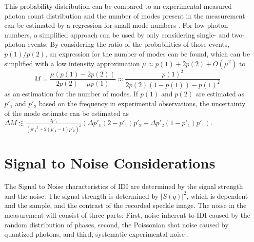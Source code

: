 This probability distribution can be compared to an experimental measured photon count distribution and the number of modes present in the measurement can be estimated by a regression for small mode numbers \cite{lehmkuhler2014,yun2019}. 
For low photon numbers, a simplified approach can be used by only considering single- and two-photon events: By considering the ratio of the probabilities of those events, $p(1) / p(2)$,  an expression for the number of modes can be found, which can be simplified with a low intensity approximation $\mu\approx p(1)+2p(2)+O(\mu^2)$ to 
\begin{equation}
	M=\frac{\mu  (p(1)-2 p(2))}{2 p(2)-\mu  p(1)}\approx \frac{p(1)^2}{2 p(2) (1-p(1))-p(1)^2}
	\label{eq:modesp1p2}
\end{equation}
as an estimation for the number of modes.
If $p(1)$ and $p(2)$ are estimated as $p'_1$ and $p'_2$ based on the frequency in experimental observations, the uncertainty of the mode estimate can be estimated as 
$\Delta M \lesssim \frac{2 p'_1}{\left({p'_1}^2+2 (p'_1-1) p'_2\right)^2} \left(\Delta p'_1 (2-p'_1) p'_2+\Delta p'_2 (1-p'_1) p'_1\right)$.

\section{Signal to Noise Considerations}
\label{sec:specklecontrast}
The Signal to Noise characteristics of IDI are determined by the signal strength and the noise:
The signal strength is determined by $\left|S(q)\right|^2$, which is dependent and the sample, and the contrast of the recorded speckle image. The noise in the measurement will consist of three parts: First, noise inherent to IDI caused by the random distribution of phases, second, the Poissonian shot noise caused by quantized photons, and third, systematic experimental noise \cite{trost2020, goodman2007}. 

